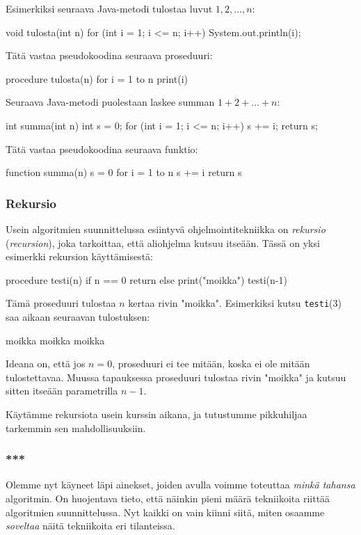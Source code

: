Esimerkiksi seuraava Java-metodi tulostaa luvut $1,2,\dots,n$:

\begin{code}
void tulosta(int n) {
    for (int i = 1; i <= n; i++) {
        System.out.println(i);
    }
}
\end{code}

Tätä vastaa pseudokoodina seuraava proseduuri:

\begin{code}
procedure tulosta(n)
    for i = 1 to n
        print(i)
\end{code}

Seuraava Java-metodi puolestaan laskee summan $1+2+\dots+n$:

\begin{code}
int summa(int n) {
    int s = 0;
    for (int i = 1; i <= n; i++) {
        s += i;
    }
    return s;
}
\end{code}

Tätä vastaa pseudokoodina seuraava funktio:

\begin{code}
function summa(n)
    s = 0
    for i = 1 to n
        s += i
    return s
\end{code}

\subsubsection{Rekursio}


Usein algoritmien suunnittelussa esiintyvä ohjelmointitekniikka on
\emph{rekursio} (\emph{recursion}),
joka tarkoittaa, että aliohjelma kutsuu itseään.
Tässä on yksi esimerkki rekursion käyttämisestä:

\begin{code}
procedure testi(n)
    if n == 0
        return
    else
        print("moikka")
        testi(n-1)
\end{code}

Tämä proseduuri tulostaa $n$ kertaa rivin "moikka".
Esimerkiksi kutsu \texttt{testi}(3) saa aikaan seuraavan tulostuksen:

\begin{code}
moikka
moikka
moikka
\end{code}

Ideana on, että jos $n=0$, proseduuri ei tee mitään,
koska ei ole mitään tulostettavaa.
Muussa tapauksessa proseduuri tulostaa rivin "moikka"
ja kutsuu sitten itseään parametrilla $n-1$.

Käytämme rekursiota usein kurssin aikana,
ja tutustumme pikkuhiljaa tarkemmin sen mahdollisuuksiin.

\subsubsection{***}

Olemme nyt käyneet läpi ainekset,
joiden avulla voimme toteuttaa \emph{minkä tahansa} algoritmin.
On huojentava tieto, että näinkin pieni määrä tekniikoita
riittää algoritmien suunnittelussa.
Nyt kaikki on vain kiinni siitä, miten osaamme \emph{soveltaa}
näitä tekniikoita eri tilanteissa.
